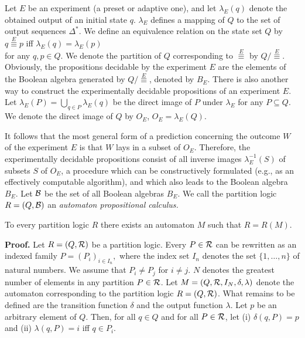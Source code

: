 \begin{definition}
Let $E$ be an experiment (a preset or adaptive one), and let
$\lambda_E(q)$
denote the obtained output of an initial
state $q$.
$\lambda_E$ defines a mapping of $Q$ to the set of output sequences
$\Delta^*$. We define an equivalence relation on the state set $Q$ by \\
$q \stackrel{E}{\equiv} p$ iff $\lambda_E(q) = \lambda_E(p)$ \\
for any $q,p \in Q$.
We denote the partition of $Q$ corresponding to $\stackrel{E}{\equiv}$
by $Q/\stackrel{E}{\equiv}$.
Obviously, the propositions decidable by the experiment $E$ are
the elements of the Boolean algebra generated by $Q/\stackrel{E}{\equiv}$,
denoted by $B_E$.
There is also another way to construct the experimentally decidable
propositions of an experiment $E$.
Let $\lambda_E(P)  = \bigcup\limits_{q \in P}\lambda_E(q)$ be the direct
image of $P$ under $\lambda_E$ for any $P \subseteq Q$.
We denote the direct image of $Q$ by $O_E$, $O_E = \lambda_E(Q)$.

It follows that the most general form of a prediction concerning
the outcome $W$ of the experiment $E$ is that $W$ lays in a subset of
$O_E$.
Therefore, the experimentally decidable propositions consist of all
inverse images $\lambda_E^{-1}(S)$ of subsets $S$ of $O_E$,
a procedure which can be constructively formulated (e.g., as an
effectively computable algorithm), and which also
leads to the Boolean algebra $B_E$.
Let ${\cal B}$ be the set of all Boolean algebras $B_E$.
We call the partition logic $R= (Q,{\cal B})$ an {\em automaton
propositional calculus.}
\end{definition}

\begin{proposition}
To every partition logic  $R$ there exists an automaton
$M$ such that
$R = R(M)$.
\end{proposition}
{\bf Proof.}
Let $R = (Q,{\cal R})$ be a partition
logic.
Every $P \in {\cal R}$ can be rewritten as an indexed family $P =
(P_i)_{i
\in I_n},$ where the index set $I_n$ denotes the set $\{1,\ldots,n\}$ of
natural numbers.
We assume that $P_i \neq P_j$ for $i \neq j$.
$N$ denotes the greatest number of elements   in any partition $P \in
{\cal R}$. Let $M = (Q,{\cal R},I_N,\delta,\lambda)$ denote the
automaton corresponding to the partition logic $R = (Q,{\cal R})$.
What remains to be defined are the
transition  function   $\delta$ and the output function $\lambda$.
Let $p$ be an arbitrary element of $Q$.
Then, for all $q \in Q$ and for all $P \in  {\cal R}$, let
(i) $\delta(q,P) = p$ and
(ii) $\lambda(q,P) = i$ iff $q \in P_i$.


